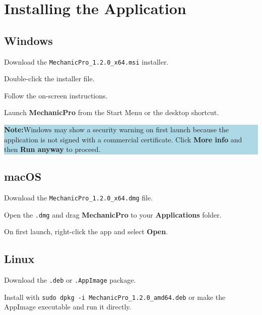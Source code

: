 \documentclass[12pt, a4paper]{report}
\newcommand{\notebox}[1]{%
	\vspace{6pt}
	\noindent
	\colorbox{LightBlue}{%
		\begin{minipage}{\dimexpr\linewidth-2\fboxsep}%
			\vspace{5pt}
			\small\textbf{\color{Blue}Note:\space}\color{Navy}#1
			\vspace{5pt}
		\end{minipage}%
	}
	\vspace{6pt}
}
\newcommand{\ui}[1]{\textbf{\color{Navy}#1}}
\begin{document}
	\section{Installing the Application}
	
	\subsection{Windows}
	
	\begin{steps}
		\item Download the \texttt{MechanicPro\_1.2.0\_x64.msi} installer.
		\item Double-click the installer file.
		\item Follow the on-screen instructions.
		\item Launch \ui{MechanicPro} from the Start Menu or the desktop shortcut.
	\end{steps}
	
	\notebox{Windows may show a security warning on first launch because the
		application is not signed with a commercial certificate. Click
		\ui{More info} and then \ui{Run anyway} to proceed.}
	
	\subsection{macOS}
	
	\begin{steps}
		\item Download the \texttt{MechanicPro\_1.2.0\_x64.dmg} file.
		\item Open the \texttt{.dmg} and drag \ui{MechanicPro} to your
		\ui{Applications} folder.
		\item On first launch, right-click the app and select \ui{Open}.
	\end{steps}
	
	\subsection{Linux}
	
	\begin{steps}
		\item Download the \texttt{.deb} or \texttt{.AppImage} package.
		\item Install with \texttt{sudo dpkg -i MechanicPro\_1.2.0\_amd64.deb}
		or make the AppImage executable and run it directly.
	\end{steps}
	
\end{document}
